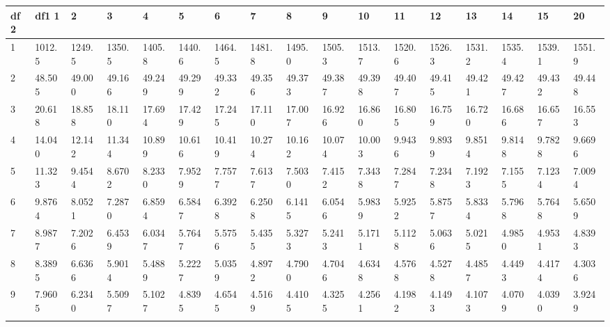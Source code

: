  {
 \fontsize{6pt}{6pt}
 \selectfont

\begin{tabular}{|m{8pt}|m{18pt}*{15}{m{18pt}}}\hline 
df2  & df1      1  &      2  &      3  &      4  &      5  &      6  &      7  &      8  &      9  &     10  &     11  &     12  &     13  &     14  &     15  &     20   \\ \hline 
  1 &  1012.5 &  1249.5 &  1350.5 &  1405.8 &  1440.6 &  1464.5 &  1481.8 &  1495.0 &  1505.3 &  1513.7 &  1520.6 &  1526.3 &  1531.2 &  1535.4 &  1539.1 &  1551.9 \\[2pt] \arrayrulecolor{light-gray}\hline\arrayrulecolor{black}  
  2 & 48.505 & 49.000 & 49.166 & 49.249 & 49.299 & 49.332 & 49.356 & 49.373 & 49.387 & 49.398 & 49.407 & 49.415 & 49.421 & 49.427 & 49.432 & 49.448 \\[2pt] \arrayrulecolor{light-gray}\hline\arrayrulecolor{black}  
  3 & 20.618 & 18.858 & 18.110 & 17.694 & 17.429 & 17.245 & 17.110 & 17.007 & 16.926 & 16.860 & 16.805 & 16.759 & 16.720 & 16.686 & 16.657 & 16.553 \\[2pt] \arrayrulecolor{light-gray}\hline\arrayrulecolor{black}  
  4 & 14.040 & 12.142 & 11.344 & 10.899 & 10.616 & 10.419 & 10.274 & 10.162 & 10.074 & 10.003 & 9.9436 & 9.8939 & 9.8514 & 9.8148 & 9.7828 & 9.6696 \\[2pt] \arrayrulecolor{light-gray}\hline\arrayrulecolor{black}  
  5 & 11.323 & 9.4544 & 8.6702 & 8.2330 & 7.9529 & 7.7577 & 7.6137 & 7.5030 & 7.4152 & 7.3438 & 7.2847 & 7.2348 & 7.1923 & 7.1555 & 7.1234 & 7.0094 \\[2pt] \arrayrulecolor{light-gray}\hline\arrayrulecolor{black}  
  6 & 9.8764 & 8.0521 & 7.2870 & 6.8594 & 6.5847 & 6.3928 & 6.2508 & 6.1415 & 6.0546 & 5.9839 & 5.9252 & 5.8757 & 5.8334 & 5.7968 & 5.7648 & 5.6509 \\[2pt] \arrayrulecolor{light-gray}\hline\arrayrulecolor{black}  
  7 & 8.9877 & 7.2026 & 6.4539 & 6.0347 & 5.7647 & 5.5756 & 5.4355 & 5.3273 & 5.2413 & 5.1711 & 5.1128 & 5.0636 & 5.0215 & 4.9850 & 4.9531 & 4.8393 \\[2pt] \arrayrulecolor{light-gray}\hline\arrayrulecolor{black}  
  8 & 8.3895 & 6.6366 & 5.9014 & 5.4889 & 5.2227 & 5.0359 & 4.8972 & 4.7900 & 4.7046 & 4.6348 & 4.5768 & 4.5278 & 4.4857 & 4.4493 & 4.4174 & 4.3036 \\[2pt] \arrayrulecolor{light-gray}\hline\arrayrulecolor{black}  
  9 & 7.9605 & 6.2340 & 5.5097 & 5.1027 & 4.8395 & 4.6545 & 4.5169 & 4.4105 & 4.3255 & 4.2561 & 4.1982 & 4.1493 & 4.1073 & 4.0709 & 4.0390 & 3.9249 \\[2pt] \arrayrulecolor{light-gray}\hline\arrayrulecolor{black}  

\end{tabular}}
